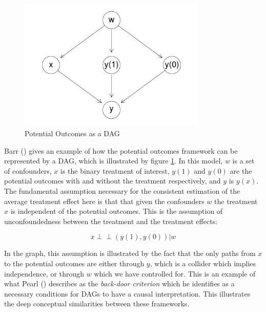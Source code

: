\documentclass{article}
\begin{document}
\begin{figure}
  \centering
  \includegraphics[width=0.8\textwidth]{images/potential_outcomes_dag.png}
  \caption{Potential Outcomes as a DAG}
  \label{dag6}
\end{figure}

Barr (\citeyear{barr2018causal}) gives an example of how the potential outcomes framework can be represented by a DAG, which is illustrated by figure \ref{dag6}. In this model, $w$ is a set of confounders, $x$ is the binary treatment of interest, $y(1)$ and $y(0)$ are the potential outcomes with and without the treatment respectively, and $y$ is $y(x)$. The fundamental assumption necessary for the consistent estimation of the average treatment effect here is that that given the confounders $w$ the treatment $x$ is independent of the potential outcomes. This is the assumption of unconfoundedness between the treatment and the treatment effects:
 
\begin{equation}
  x \perp \!\!\! \perp  (y(1), y(0)) | w
\end{equation}

In the graph, this assumption is illustrated by the fact that the only paths from $x$ to the potential outcomes are either through $y$, which is a collider which implies independence, or through $w$ which we have controlled for. This is an example of what Pearl (\citeyear{pearl2018book}) describes as the \textit{back-door criterion} which he identifies as a necessary conditions for DAGs to have a causal interpretation. This illustrates the deep conceptual similarities between these frameworks.
\end{document}
